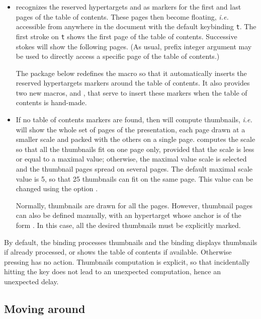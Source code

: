 \documentclass[12pt]{article}
\begin{document}
\begin {itemize}

\item {\ActiveDVI} recognizes the reserved hypertargets
 and  as markers for the first and
last pages of the table of contents. These pages then become floating,
{\em i.e.} accessible from anywhere in the document with the default
keybinding \verb't'. The first stroke on \verb't' shows the first page
of the table of contents. Successive stokes will show the following
pages. (As usual, prefix integer argument may be used to directly
access a specific page of the table of contents.)

The package  below redefines the macro
{\docdef \tableofcontents} so that it automatically inserts the
reserved hypertargets markers around the table of contents. It also
provides two new macros, {\docdef \advitoc} and \docdef \endadvitoc,
that serve to insert these markers when the table of contents is
hand-made.

\item If no table of contents markers are found, then {\ActiveDVI}
will compute thumbnails, {\em i.e.} will show the whole set of pages
of the presentation, each page drawn at a smaller scale and packed
with the others on a single page. {\ActiveDVI} computes the scale so
that all the thumbnails fit on one page only, provided that the scale
is less or equal to a maximal value; otherwise, the maximal value
scale is selected and the thumbnail pages spread on several pages. The
default maximal scale value is 5, so that 25 thumbnails can fit on the
same page. This value can be changed using the option
.

Normally, thumbnails are drawn for all the pages. However, thumbnail
pages can also be defined manually, with an hypertarget whose anchor
is of the form . In this case, all the
desired thumbnails must be explicitly marked.

\end{itemize}

By default, the binding  processes thumbnails and the binding
 displays thumbnails if already processed, or shows the table
of contents if available. Otherwise pressing  has no
action. Thumbnails computation is explicit, so that incidentally
hitting the  key does not lead to an unexpected computation,
hence an unexpected delay.

\subsection{Moving around}
\end{document}
